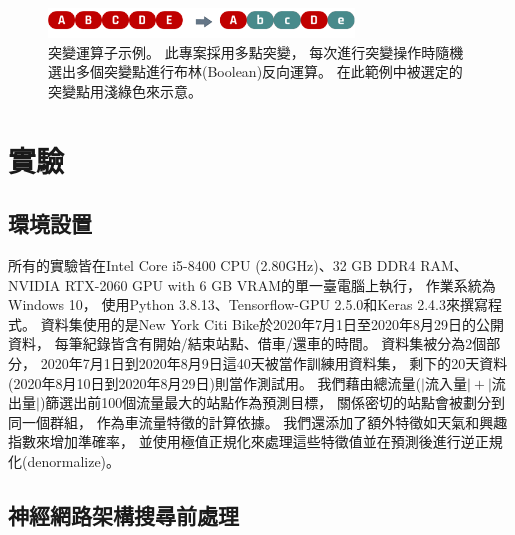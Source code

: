 \documentclass[a4paper,12pt]{extarticle}
\begin{document}
            \begin{figure}[htb]
                \centering
                \includegraphics[width=0.725\textwidth]{mutation.pdf}
                \caption{
                    突變運算子示例。
                    此專案採用多點突變，
                    每次進行突變操作時隨機選出多個突變點進行布林(Boolean)反向運算。
                    在此範例中被選定的突變點用淺綠色來示意。
                }
                \label{fig:mutation}
            \end{figure}
    \newpage

    \section{實驗}
        \subsection{環境設置}
            
            所有的實驗皆在Intel Core i5-8400 CPU (2.80GHz)、32 GB DDR4 RAM、NVIDIA RTX-2060 GPU with 6 GB VRAM的單一臺電腦上執行，
            作業系統為Windows 10，
            使用Python 3.8.13、Tensorflow-GPU 2.5.0和Keras 2.4.3來撰寫程式。
            資料集使用的是New York Citi Bike於2020年7月1日至2020年8月29日的公開資料，
            每筆紀錄皆含有開始/結束站點、借車/還車的時間。
            資料集被分為2個部分，
            2020年7月1日到2020年8月9日這40天被當作訓練用資料集，
            剩下的20天資料(2020年8月10日到2020年8月29日)則當作測試用。
            我們藉由總流量($\lvert$流入量$\rvert + \lvert$流出量$\rvert$)篩選出前100個流量最大的站點作為預測目標，
            關係密切的站點會被劃分到同一個群組，
            作為車流量特徵的計算依據。
            我們還添加了額外特徵如天氣和興趣指數來增加準確率，
            並使用極值正規化來處理這些特徵值並在預測後進行逆正規化(denormalize)。

        \subsection{神經網路架構搜尋前處理}
\end{document}
